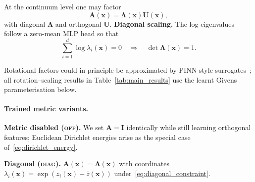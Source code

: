 \documentclass{article}
\theoremstyle{plain}
\theoremstyle{definition}
\theoremstyle{remark}
\begin{document}
At the continuum level one may factor
\begin{equation}
    \label{eq:amat_factorisation}
    \mathbf{A}(\mathbf{x}) = \mathbf{\Lambda} (\mathbf{x}) \mathbf{U}(\mathbf{x}),
\end{equation}
with diagonal $\boldsymbol{\Lambda}$ and orthogonal $\mathbf{U}$.
\textbf{Diagonal scaling.} The log-eigenvalues follow a zero-mean MLP head so that
\begin{equation}
    \label{eq:diagonal_constraint}
    \sum_{i=1}^{d} \log \lambda_i(\mathbf{x}) = 0
    \quad\Rightarrow\quad
    \det \boldsymbol{\Lambda}(\mathbf{x}) = 1.
\end{equation}

Rotational factors could in principle be approximated by PINN-style surrogates~\cite{LAGARIS19971}; all rotation--scaling results in Table~\ref{tab:main_results} use the learnt Givens parameterisation below.

\paragraph{Trained metric variants.}
\textbf{Metric disabled (\textsc{off}).}
We set $\mathbf{A}=\mathbf{I}$ identically while still learning orthogonal features; Euclidean Dirichlet energies arise as the special case of~\eqref{eq:dirichlet_energy}.

\textbf{Diagonal (\textsc{diag}).} $\mathbf{A}(\mathbf{x})=\boldsymbol{\Lambda}(\mathbf{x})$ with coordinates $\lambda_i(\mathbf{x})=\exp(z_i(\mathbf{x})-\bar z(\mathbf{x}))$ under~\eqref{eq:diagonal_constraint}.
\end{document}
